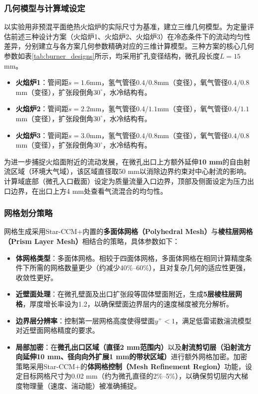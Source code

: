\subsubsection{几何模型与计算域设定}

以实验用非预混平面绝热火焰炉的实际尺寸为基准，建立三维几何模型。为定量评估前述三种设计方案（火焰炉1、火焰炉2、火焰炉3）在冷态条件下的流动均匀性差异，分别建立与各方案几何参数精确对应的三维计算模型。三种方案的核心几何参数如表\ref{tab:burner_designs}所示，均采用扩孔变径结构，微孔段长度$L=15$mm。

\begin{itemize}
	\item \textbf{火焰炉1}：管间距$s=1.6$mm，氢气管径$0.4/0.8$mm（变径），氧气管径$0.4/0.8$mm（变径），扩张段倒角$30^\circ$，水冷结构有。
	\item \textbf{火焰炉2}：管间距$s=2.2$mm，氢气管径$0.4/1.1$mm（变径），氧气管径$0.4/1.1$mm（变径），扩张段倒角$30^\circ$，水冷结构有。
	\item \textbf{火焰炉3}：管间距$s=3.0$mm，氢气管径$0.4/0.8$mm（变径），氧气管径$0.4/0.8$mm（变径），扩张段倒角$30^\circ$，水冷结构有。
\end{itemize}

为进一步捕捉火焰面附近的流动发展，在微孔出口上方额外延伸\textbf{10 mm}的自由射流区域（环境大气域），该区域直径取50 mm以消除边界约束对中心射流的影响。计算域底部（微孔入口截面）设定为质量流量入口边界，顶部及侧面设定为压力出口边界，在出口上方4 mm处查看气流混合的均匀性。

\subsubsection{网格划分策略}

网格生成采用Star-CCM+内置的\textbf{多面体网格（Polyhedral Mesh）}与\textbf{棱柱层网格（Prism Layer Mesh）}相结合的策略，具体参数如下：

\begin{itemize}
	\item \textbf{体网格类型}：多面体网格。相较于四面体网格，多面体网格在相同计算精度条件下所需的网格数量更少（约减少40\%--60\%），且对复杂几何的适应性更强，收敛性更好。
	\item \textbf{近壁面处理}：在微孔壁面及出口扩张段等固体壁面附近，生成\textbf{5层棱柱层网格}，厚度增长率设为1.2，以确保壁面边界层内的速度梯度被充分解析。
	\item \textbf{边界层分辨率}：控制第一层网格高度使得壁面$y^+ < 1$，满足低雷诺数湍流模型对近壁面网格精度的要求。
	\item \textbf{局部加密}：在\textbf{微孔出口区域（直径2 mm范围内）}以及\textbf{射流剪切层（沿射流方向延伸10 mm、径向向外扩展1 mm的带状区域）}进行额外网格加密。加密策略采用Star-CCM+的\textbf{体网格控制（Mesh Refinement Region）}功能，设定目标网格尺寸为0.02 mm（约为微孔直径的2\%--5\%），以确保剪切层内大梯度物理量（速度、湍动能）被准确捕捉。
\end{itemize}

